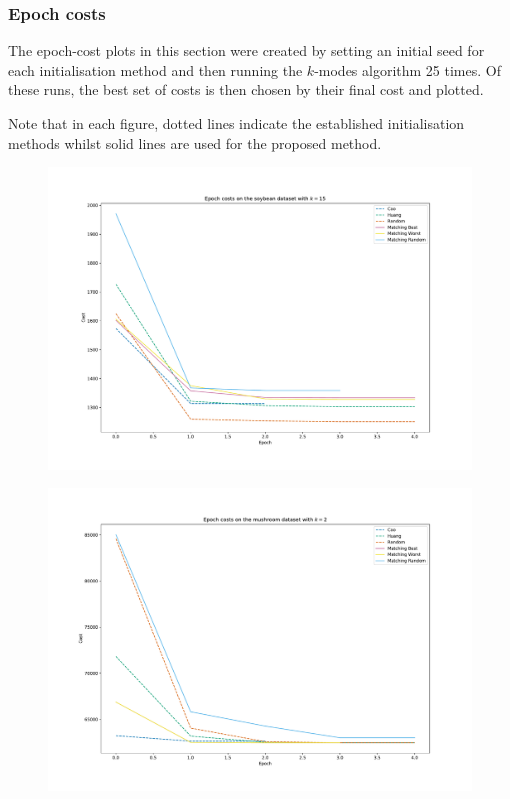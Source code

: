 \begin{table}[H]
    \centering
    \resizebox{.9\textwidth}{!}{%
        
    }
    \label{tab:breast_cancer_results}\vspace{20pt}

    \resizebox{.9\textwidth}{!}{%
        
    }
    \label{tab:zoo_animal_results}
\end{table}
\doublespacing%

\subsubsection{Epoch costs}

The epoch-cost plots in this section were created by setting an initial seed for
each initialisation method and then running the \(k\)-modes algorithm 25 times.
Of these runs, the best set of costs is then chosen by their final cost and
plotted.

Note that in each figure, dotted lines indicate the established initialisation
methods whilst solid lines are used for the proposed method.

\begin{figure}[h!]
    \centering
    \includegraphics[width=.8\textwidth]{./img/epoch_plot_soybean.pdf}
\end{figure}

\begin{figure}[h!]
    \centering
    \includegraphics[width=.8\textwidth]{./img/epoch_plot_mushroom.pdf}
\end{figure}

